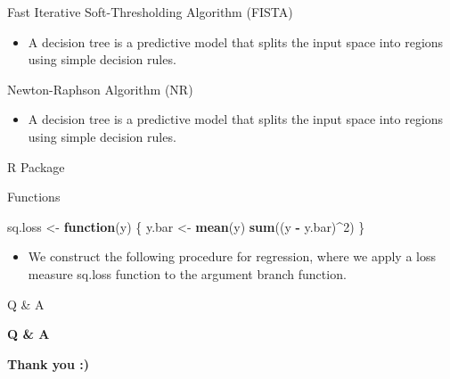 \documentclass[
  8pt,
  ignorenonframetext,
]{beamer}
\newenvironment{Shaded}{\begin{snugshade}}{\end{snugshade}}
\newcommand{\ControlFlowTok}[1]{\textcolor[rgb]{0.13,0.29,0.53}{\textbf{#1}}}
\newcommand{\DecValTok}[1]{\textcolor[rgb]{0.00,0.00,0.81}{#1}}
\newcommand{\FunctionTok}[1]{\textcolor[rgb]{0.13,0.29,0.53}{\textbf{#1}}}
\newcommand{\NormalTok}[1]{#1}
\newcommand{\OtherTok}[1]{\textcolor[rgb]{0.56,0.35,0.01}{#1}}
\newcommand{\SpecialCharTok}[1]{\textcolor[rgb]{0.81,0.36,0.00}{\textbf{#1}}}
\providecommand{\tightlist}{%
  \setlength{\itemsep}{0pt}\setlength{\parskip}{0pt}}
\begin{document}
\begin{frame}{Fast Iterative Soft-Thresholding Algorithm (FISTA)}
\label{fast-iterative-soft-thresholding-algorithm-fista}
\begin{itemize}
\tightlist
\item
  A decision tree is a predictive model that splits the input space into
  regions using simple decision rules.
\end{itemize}
\end{frame}

\begin{frame}{Newton-Raphson Algorithm (NR)}
\label{newton-raphson-algorithm-nr}
\begin{itemize}
\tightlist
\item
  A decision tree is a predictive model that splits the input space into
  regions using simple decision rules.
\end{itemize}

\begin{block}{R Package}
\label{r-package}
\end{block}
\end{frame}

\begin{frame}[fragile]{Functions}
\label{functions}
\begin{Shaded}
\begin{Highlighting}[]
\NormalTok{sq.loss }\OtherTok{\textless{}{-}} \ControlFlowTok{function}\NormalTok{(y) \{}
\NormalTok{  y.bar }\OtherTok{\textless{}{-}} \FunctionTok{mean}\NormalTok{(y)}
  \FunctionTok{sum}\NormalTok{((y }\SpecialCharTok{{-}}\NormalTok{ y.bar)}\SpecialCharTok{\^{}}\DecValTok{2}\NormalTok{)}
\NormalTok{\}}
\end{Highlighting}
\end{Shaded}

\begin{itemize}
\tightlist
\item
  We construct the following procedure for regression, where we apply a
  loss measure sq.loss function to the argument branch function.
\end{itemize}

\begin{block}{Q \& A}
\label{q-a}
\begin{center}
  {\bf {\Huge Q \& A}}
\end{center}
\end{block}

\begin{block}{}
\label{section}
\begin{center}
  {\bf {\Huge Thank you :)}}
\end{center}
\end{block}
\end{frame}
\end{document}
